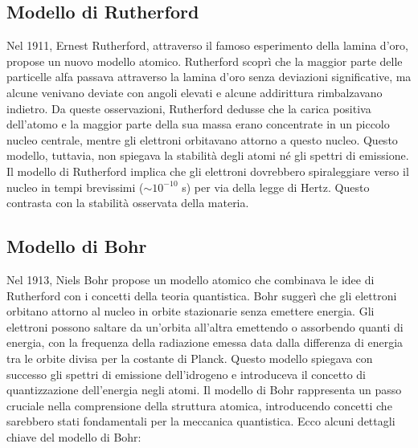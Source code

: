 \subsection*{Modello di Rutherford}
Nel 1911, Ernest Rutherford, attraverso il famoso esperimento della lamina d'oro, propose un nuovo modello atomico. Rutherford scoprì che la maggior parte delle particelle alfa passava attraverso la lamina d'oro senza deviazioni significative, ma alcune venivano deviate con angoli elevati e alcune addirittura rimbalzavano indietro. Da queste osservazioni, Rutherford dedusse che la carica positiva dell'atomo e la maggior parte della sua massa erano concentrate in un piccolo nucleo centrale, mentre gli elettroni orbitavano attorno a questo nucleo. Questo modello, tuttavia, non spiegava la stabilità degli atomi né gli spettri di emissione.
Il modello di Rutherford implica che gli elettroni dovrebbero spiraleggiare verso il nucleo in tempi brevissimi (\(\sim 10^{-10}\) s) per via della legge di Hertz. Questo contrasta con la stabilità osservata della materia.


\subsection*{Modello di Bohr}
Nel 1913, Niels Bohr propose un modello atomico che combinava le idee di Rutherford con i concetti della teoria quantistica. Bohr suggerì che gli elettroni orbitano attorno al nucleo in orbite stazionarie senza emettere energia. Gli elettroni possono saltare da un'orbita all'altra emettendo o assorbendo quanti di energia, con la frequenza della radiazione emessa data dalla differenza di energia tra le orbite divisa per la costante di Planck. Questo modello spiegava con successo gli spettri di emissione dell'idrogeno e introduceva il concetto di quantizzazione dell'energia negli atomi.
Il modello di Bohr rappresenta un passo cruciale nella comprensione della struttura atomica, introducendo concetti che sarebbero stati fondamentali per la meccanica quantistica. Ecco alcuni dettagli chiave del modello di Bohr:

